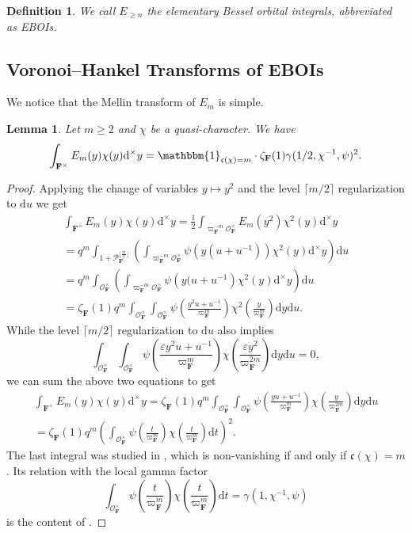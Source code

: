 \documentclass[A4]{amsart}
\def\geq{\geqslant}
\newtheorem{definition} [theorem] {Definition}
\newtheorem{lemma}      [theorem]{Lemma}
\numberwithin{equation}{section} \everymath{\displaystyle}
\newcommand{\id}{\mathbbm{1}}
\newcommand{\ud}{\mathrm{d}}
\newcommand{\F}{\mathbf{F}}
\newcommand{\vO}{\mathcal{O}}
\newcommand{\vP}{\mathcal{P}}
\newcommand{\cond}{\mathfrak{c}}
\begin{document}
\begin{definition} \label{def: EBOI}
	We call $E_{\geq n}$ the \emph{elementary Bessel orbital integrals}, abbreviated as {\rm EBOI}s.
\end{definition}


	\subsection{Voronoi--Hankel Transforms of EBOIs}
	
	We notice that the Mellin transform of $E_m$ is simple.
\begin{lemma} \label{lem: MellinStEBOI}
	Let $m \geq 2$ and $\chi$ be a quasi-character. We have
	$$ \int_{\F^{\times}} E_m(y) \chi(y) \ud^{\times} y = \id_{\cond(\chi)=m} \cdot \zeta_{\F}(1) \gamma(1/2,\chi^{-1},\psi)^2. $$
\end{lemma} 
\begin{proof}
	Applying the change of variables $y \mapsto y^2$ and the level $\lceil m/2 \rceil$ regularization to $\ud u$ we get
\begin{multline*}
	\int_{\F^{\times}} E_m(y) \chi(y) \ud^{\times} y = \frac{1}{2} \int_{\varpi_{\F}^{-m}\vO_{\F}^{\times}} E_m(y^2) \chi^2(y) \ud^{\times}y \\
	= q^m \int_{1+\vP_{\F}^{\lfloor \frac{m}{2} \rfloor}} \left( \int_{\varpi_{\F}^{-m} \vO_{\F}^{\times}} \psi \left( y(u+u^{-1}) \right) \chi^2(y) \ud^{\times} y \right) \ud u \\
	= q^m \int_{\vO_{\F}^{\times}} \left( \int_{\varpi_{\F}^{-m} \vO_{\F}^{\times}} \psi \left( y(u+u^{-1} \right) \chi^2(y) \ud^{\times} y \right) \ud u \\
	= \zeta_{\F}(1) q^m \int_{\vO_{\F}^{\times}} \int_{\vO_{\F}^{\times}} \psi \left( \frac{y^2u+u^{-1}}{\varpi_{\F}^m} \right) \chi^2 \left( \frac{y}{\varpi_{\F}^m} \right) \ud y \ud u.
\end{multline*}
	While the level $\lceil m/2 \rceil$ regularization to $\ud u$ also implies
	$$ \int_{\vO_{\F}^{\times}} \int_{\vO_{\F}^{\times}} \psi \left( \frac{\varepsilon y^2u+u^{-1}}{\varpi_{\F}^m} \right) \chi \left( \frac{\varepsilon y^2}{\varpi_{\F}^{2m}} \right) \ud y \ud u = 0, $$
	we can sum the above two equations to get
\begin{multline*} 
	\int_{\F^{\times}} E_m(y) \chi(y) \ud^{\times} y = \zeta_{\F}(1) q^m \int_{\vO_{\F}^{\times}} \int_{\vO_{\F}^{\times}} \psi \left( \frac{yu+u^{-1}}{\varpi_{\F}^m} \right) \chi \left( \frac{y}{\varpi_{\F}^{2m}} \right) \ud y \ud u \\
	= \zeta_{\F}(1) q^m \left( \int_{\vO_{\F}^{\times}} \psi \left( \frac{t}{\varpi_{\F}^m} \right) \chi \left( \frac{t}{\varpi_{\F}^m} \right) \ud t \right)^2.
\end{multline*}
	The last integral was studied in \cite[Proposition 4.6]{Wu14}, which is non-vanishing if and only if $\cond(\chi)=m$. Its relation with the local gamma factor 
	$$ \int_{\vO_{\F}^{\times}} \psi \left( \frac{t}{\varpi_{\F}^m} \right) \chi \left( \frac{t}{\varpi_{\F}^m} \right) \ud t = \gamma(1, \chi^{-1}, \psi) $$
	is the content of \cite[Exercise 23.5]{BuH06}.
\end{proof}
\end{document}
